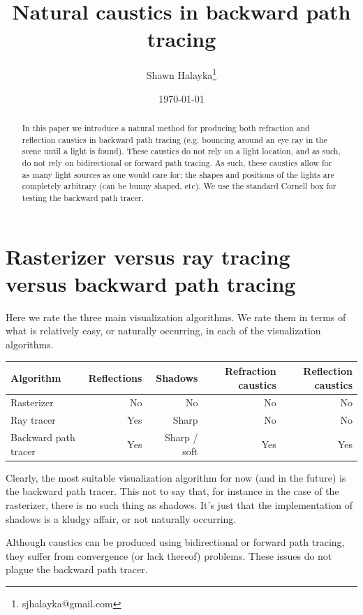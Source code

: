 \documentclass[12pt]{article}
\title{Natural caustics in backward path tracing}
\author{
Shawn Halayka\footnote{sjhalayka@gmail.com}
}
\date{\today\;\currenttime}
\begin{document}
\newcommand{\abs}[1]{\lvert#1\rvert}



\maketitle




\begin{abstract}
In this paper we introduce a natural method for producing both refraction and reflection caustics in backward path tracing (e.g. bouncing around an eye ray in the scene until a light is found).
These caustics do not rely on a light location, and as such, do not rely on bidirectional or forward path tracing.
As such, these caustics allow for as many light sources as one would care for; the shapes and positions of the lights are completely arbitrary (can be bunny shaped, etc).
We use the standard Cornell box for testing the backward path tracer.
\end{abstract}

\section{Rasterizer versus ray tracing versus backward path tracing}

Here we rate the three main visualization algorithms.
We rate them in terms of what is relatively easy, or naturally occurring, in each of the visualization algorithms.
\begin{center}
\begin{tabular}{| l | r | r | r | r |}
  \hline
 Algorithm &  Reflections & Shadows & Refraction caustics & Reflection caustics \\
\hline
\hline
Rasterizer & No & No & No &  No \\
Ray tracer & Yes & Sharp & No & No  \\
Backward path tracer & Yes & Sharp / soft & Yes & Yes \\
  \hline  
\end{tabular}
\end{center}
Clearly, the most suitable visualization algorithm for now (and in the future) is the backward path tracer.
This not to say that, for instance in the case of the rasterizer, there is no such thing as shadows.
It's just that the implementation of shadows is a kludgy affair, or not naturally occurring.

Although caustics can be produced using bidirectional or forward path tracing, they suffer from convergence (or lack thereof) problems.
These issues do not plague the backward path tracer.
\end{document}
